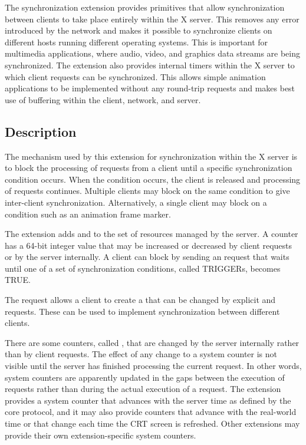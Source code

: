 The synchronization extension provides primitives that allow synchronization
between clients to take place entirely within the X server. This removes any
error introduced by the network and makes it possible to synchronize clients
on different hosts running different operating systems. This is important for
multimedia applications, where audio, video, and graphics data streams are
being synchronized. The extension also provides internal timers within the X
server to which client requests can be synchronized. This allows simple
animation applications to be implemented without any round-trip requests and
makes best use of buffering within the client, network, and server.

\subsection{Description}

The mechanism used by this extension for synchronization within the X server
is to block the processing of requests from a client until a specific
synchronization condition occurs. When the condition occurs, the client is
released and processing of requests continues. Multiple clients may block on
the same condition to give inter-client synchronization.  Alternatively, a
single client may block on a condition such as an animation frame marker.

The extension adds  and  to the set of resources
managed by the server. A counter has a 64-bit integer value that may be
increased or decreased by client requests or by the server internally. A
client can block by sending an  request that waits until
one of a set of synchronization conditions, called TRIGGERs, becomes TRUE.

The  request allows a client to create a
 that can be changed by explicit  and
 requests. These can be used to implement
synchronization between different clients.

There are some counters, called , that are changed by
the server internally rather than by client requests. The effect of any change
to a system counter is not visible until the server has finished processing the
current request. In other words, system counters are apparently updated in the
gaps between the execution of requests rather than during the actual execution
of a request. The extension provides a system counter that advances with the
server time as defined by the core protocol, and it may also provide counters
that advance with the real-world time or that change each time the CRT
screen is refreshed.  Other extensions may provide their own
extension-specific system counters.

